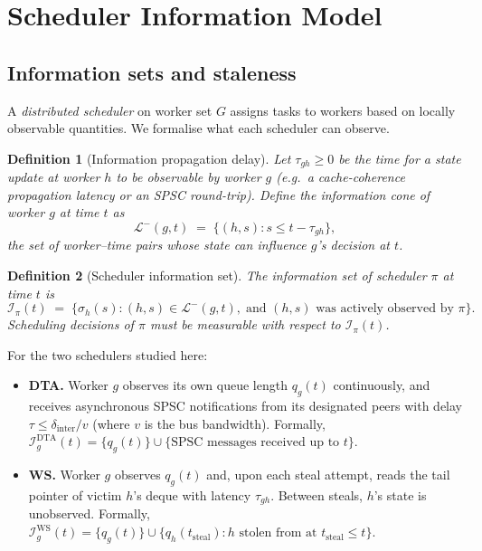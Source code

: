 \documentclass[11pt,a4paper]{report}
\newtheorem{definition}{Definition}[section]
\begin{document}
\section{Scheduler Information Model}
\label{sec:info_model}

\subsection{Information sets and staleness}

A \emph{distributed scheduler} on worker set $G$ assigns tasks to workers
based on locally observable quantities.  We formalise what each scheduler
can observe.

\begin{definition}[Information propagation delay]\label{def:tau}
Let $\tau_{gh} \geq 0$ be the time for a state update at worker $h$ to be
observable by worker $g$ (e.g.\ a cache-coherence propagation latency
or an SPSC round-trip).  Define the \emph{information cone} of worker $g$
at time $t$ as
\[
  \mathcal{L}^-(g,t)
  \;=\;
  \bigl\{(h,s) : s \leq t - \tau_{gh}\bigr\},
\]
the set of worker--time pairs whose state can influence $g$'s decision at $t$.
\end{definition}

\begin{definition}[Scheduler information set]\label{def:info_set}
The \emph{information set} of scheduler $\pi$ at time $t$ is
\[
  \mathcal{I}_\pi(t)
  \;=\;
  \bigl\{\sigma_h(s) : (h,s) \in \mathcal{L}^-(g,t),\;
         \text{and } (h,s) \text{ was actively observed by } \pi\bigr\}.
\]
Scheduling decisions of $\pi$ must be measurable with respect to
$\mathcal{I}_\pi(t)$.
\end{definition}

For the two schedulers studied here:
\begin{itemize}
  \item \textbf{DTA.} Worker $g$ observes its own queue length $q_g(t)$
        continuously, and receives asynchronous SPSC notifications from
        its designated peers with delay $\tau \leq \delta_{\mathrm{inter}}/v$
        (where $v$ is the bus bandwidth).
        Formally, $\mathcal{I}_g^{\mathrm{DTA}}(t)
        = \{q_g(t)\} \cup \{\text{SPSC messages received up to }t\}$.

  \item \textbf{WS.} Worker $g$ observes $q_g(t)$ and, upon each steal
        attempt, reads the tail pointer of victim $h$'s deque with latency
        $\tau_{gh}$.  Between steals, $h$'s state is unobserved.
        Formally, $\mathcal{I}_g^{\mathrm{WS}}(t)
        = \{q_g(t)\} \cup \{q_h(t_{\mathrm{steal}}) : h \text{ stolen from at } t_{\mathrm{steal}} \leq t\}$.
\end{itemize}
\end{document}
